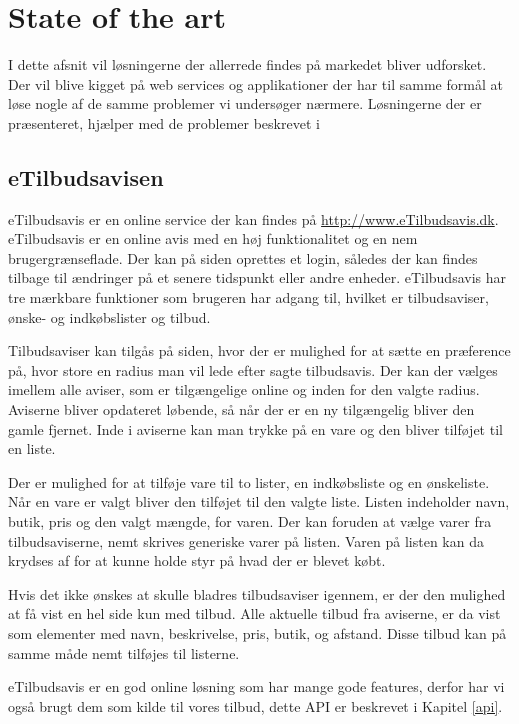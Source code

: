 \chapter{State of the art}
I dette afsnit vil løsningerne der allerrede findes på markedet bliver udforsket.
Der vil blive kigget på web services og applikationer der har til samme formål at løse nogle af de samme problemer vi undersøger nærmere.
Løsningerne der er præsenteret, hjælper med de problemer beskrevet i 

\section{eTilbudsavisen}
eTilbudsavis er en online service der kan findes på \url{http://www.eTilbudsavis.dk}. eTilbudsavis er en online avis med en høj funktionalitet og en nem brugergrænseflade.
Der kan på siden oprettes et login, således der kan findes tilbage til ændringer på et senere tidspunkt eller andre enheder.
eTilbudsavis har tre mærkbare funktioner som brugeren har adgang til, hvilket er tilbudsaviser, ønske- og indkøbslister og tilbud.

Tilbudsaviser kan tilgås på siden, hvor der er mulighed for at sætte en præference på, hvor store en radius man vil lede efter sagte tilbudsavis. 
Der kan der vælges imellem alle aviser, som er tilgængelige online og inden for den valgte radius. 
Aviserne bliver opdateret løbende, så når der er en ny tilgængelig bliver den gamle fjernet. 
Inde i aviserne kan man trykke på en vare og den bliver tilføjet til en liste.

Der er mulighed for at tilføje vare til to lister, en indkøbsliste og en ønskeliste. 
Når en vare er valgt bliver den tilføjet til den valgte liste.
Listen indeholder navn, butik, pris og den valgt mængde, for varen. 
Der kan foruden at vælge varer fra tilbudsaviserne, nemt skrives generiske varer på listen. Varen på listen kan da krydses af for at kunne holde styr på hvad der er blevet købt.

Hvis det ikke ønskes at skulle bladres tilbudsaviser igennem, er der den mulighed at få vist en hel side kun med tilbud. 
Alle aktuelle tilbud fra aviserne, er da vist som elementer med navn, beskrivelse, pris, butik, og afstand. Disse tilbud kan på samme måde nemt tilføjes til listerne.

eTilbudsavis er en god online løsning som har mange gode features, derfor har vi også brugt dem som kilde til vores tilbud, dette API er beskrevet i Kapitel \ref{api}.

